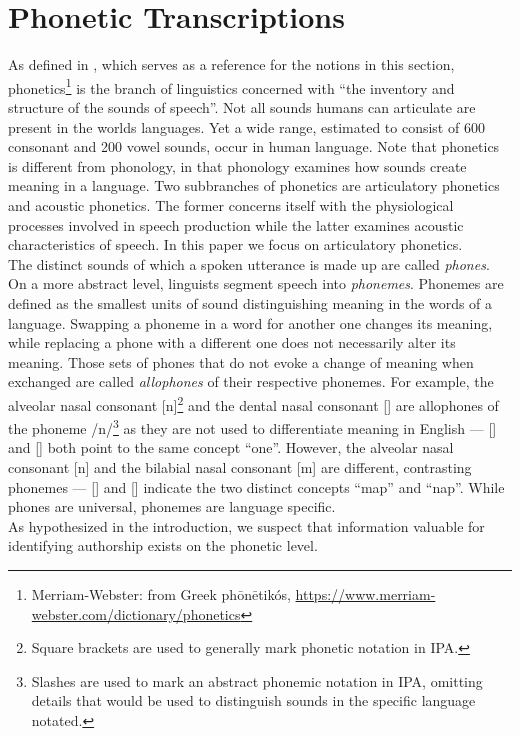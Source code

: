 \section{Phonetic Transcriptions}\label{sec:phonetic_transcriptions}
As defined in \cite{ogrady2017introToLinguistics}, which serves as a reference for the notions in this section, phonetics\footnote{Merriam-Webster: from Greek ph$\bar{\mbox{o}}$n$\bar{\mbox{e}}$tik\'os, \url{https://www.merriam-webster.com/dictionary/phonetics}} is the branch of linguistics concerned with ``the inventory and structure of the sounds of speech''.
Not all sounds humans can articulate are present in the worlds languages.
Yet a wide range, estimated to consist of 600 consonant and 200 vowel sounds, occur in human language.
Note that phonetics is different from phonology, in that phonology examines how sounds create meaning in a language.
Two subbranches of phonetics are articulatory phonetics and acoustic phonetics.
The former concerns itself with the physiological processes involved in speech production while the latter examines acoustic characteristics of speech.
In this paper we focus on articulatory phonetics.\\
The distinct sounds of which a spoken utterance is made up are called \textit{phones}.
On a more abstract level, linguists segment speech into \textit{phonemes}.
Phonemes are defined as the smallest units of sound distinguishing meaning in the words of a language.
Swapping a phoneme in a word for another one changes its meaning, while replacing a phone with a different one does not necessarily alter its meaning.
Those sets of phones that do not evoke a change of meaning when exchanged are called \textit{allophones} of their respective phonemes.
For example, the alveolar nasal consonant [n]\footnote{Square brackets are used to generally mark phonetic notation in IPA.} and the dental nasal consonant [\textipa{\|[n}] are allophones of the phoneme /n/\footnote{Slashes are used to mark an abstract phonemic notation in IPA, omitting details that would be used to distinguish sounds in the specific language notated.} as they are not used to differentiate meaning in English --- [] and [\textipa{w2\|[n}] both point to the same concept ``one''.
However, the alveolar nasal consonant [n] and the bilabial nasal consonant [m] are different, contrasting phonemes --- [] and [] indicate the two distinct concepts ``map'' and ``nap''.
While phones are universal, phonemes are language specific.\\
As hypothesized in the introduction, we suspect that information valuable for identifying authorship exists on the phonetic level.
